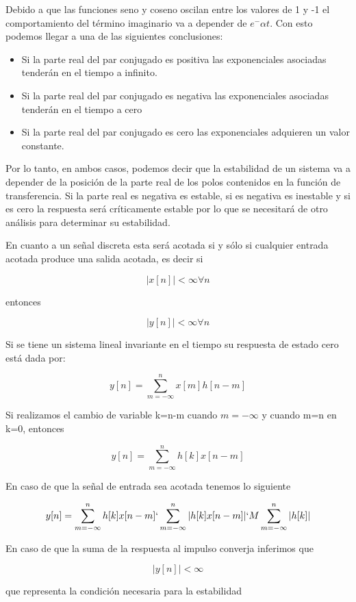 Debido a que las funciones seno y coseno oscilan entre los valores de 1 y -1 el comportamiento del término imaginario va a depender de $e^-{\alpha t}$. Con esto podemos llegar a una de las siguientes conclusiones:

\begin{itemize}
\item Si la parte real del par conjugado es positiva las exponenciales asociadas tenderán en el tiempo a infinito.
\item Si la parte real del par conjugado es negativa las exponenciales asociadas tenderán en el tiempo a cero
\item Si la parte real del par conjugado es cero las exponenciales adquieren un valor constante.
\end{itemize}

Por lo tanto, en ambos casos, podemos decir que la estabilidad de un sistema va a depender de la posición de la parte real de los polos contenidos en la función de transferencia. Si la parte real es negativa es estable, si es negativa es inestable y si es cero la respuesta será críticamente estable por lo que se necesitará de otro análisis para determinar su estabilidad.

En cuanto a un señal discreta esta será acotada si y sólo si cualquier entrada acotada produce una salida acotada, es decir si

\begin{equation}
|x[n]|<\infty \forall n
\end{equation}

entonces 

\begin{equation}
|y[n]|<\infty \forall n
\end{equation}

Si se tiene un sistema lineal invariante en el tiempo su respuesta de estado cero está dada por:

\begin{equation}
y[n]=\sum_{m=-\infty}^n x[m]h[n-m]
\end{equation}

Si realizamos el cambio de variable k=n-m cuando $m=-\infty$ y cuando m=n en k=0, entonces

\begin{equation}
y[n]=\sum_{m=-\infty}^n h[k]x[n-m]
\end{equation}

En caso de que la señal de entrada sea acotada tenemos lo siguiente

\begin{equation}
y[n]=\sum_{m=-\infty}^n h[k]x[n-m] \lq \sum_{m=-\infty}^n |h[k]x[n-m]| \lq M\sum_{m=-\infty}^n |h[k]|
\end{equation}

En caso de que la suma de la respuesta al impulso converja inferimos que 

\begin{equation}
|y[n]|<\infty
\end{equation}

que representa la condición necesaria para la estabilidad